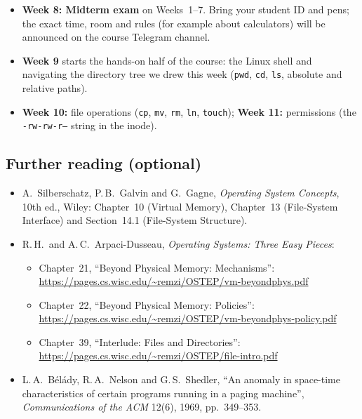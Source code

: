 \documentclass[11pt,a4paper]{article}
\newcommand{\cmd}[1]{\texttt{#1}}
\begin{document}
\begin{itemize}
  \item \textbf{Week 8: Midterm exam} on Weeks~1--7. Bring your student ID and pens; the exact time, room and rules (for example about calculators) will be announced on the course Telegram channel.
  \item \textbf{Week 9} starts the hands-on half of the course: the Linux shell and navigating the directory tree we drew this week (\cmd{pwd}, \cmd{cd}, \cmd{ls}, absolute and relative paths).
  \item \textbf{Week 10:} file operations (\cmd{cp}, \cmd{mv}, \cmd{rm}, \cmd{ln}, \cmd{touch}); \textbf{Week 11:} permissions (the \texttt{-rw-rw-r--} string in the inode).
\end{itemize}

\subsection*{Further reading (optional)}
\begin{itemize}
  \item A.\ Silberschatz, P.\,B.\ Galvin and G.\ Gagne, \emph{Operating System Concepts}, 10th ed., Wiley: Chapter~10 (Virtual Memory), Chapter~13 (File-System Interface) and Section~14.1 (File-System Structure).
  \item R.\,H.\ and A.\,C.\ Arpaci-Dusseau, \emph{Operating Systems: Three Easy Pieces}:
  \begin{itemize}
    \item Chapter~21, ``Beyond Physical Memory: Mechanisms'': \url{https://pages.cs.wisc.edu/~remzi/OSTEP/vm-beyondphys.pdf}
    \item Chapter~22, ``Beyond Physical Memory: Policies'': \url{https://pages.cs.wisc.edu/~remzi/OSTEP/vm-beyondphys-policy.pdf}
    \item Chapter~39, ``Interlude: Files and Directories'': \url{https://pages.cs.wisc.edu/~remzi/OSTEP/file-intro.pdf}
  \end{itemize}
  \item L.\,A.\ Bélády, R.\,A.\ Nelson and G.\,S.\ Shedler, ``An anomaly in space-time characteristics of certain programs running in a paging machine'', \emph{Communications of the ACM} 12(6), 1969, pp.~349--353.
\end{itemize}
\end{document}
